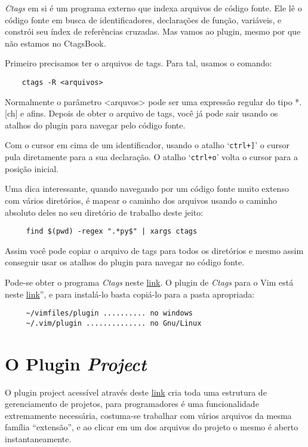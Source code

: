 {\em Ctags} em si é um programa externo que indexa arquivos de código fonte. Ele lê
o código fonte em busca de identificadores, declarações de função, variáveis, e constrói seu 
índex de referências cruzadas. Mas vamos ao plugin, mesmo por que não estamos no CtagsBook.

Primeiro precisamos ter o arquivos de tags. Para tal, usamos o comando:

\begin{verbatim}
    ctags -R <arquivos>
\end{verbatim}

Normalmente o parâmetro <arquvos> pode ser uma expressão regular do tipo *.[ch] e afins. Depois
de obter o arquivo de tags, você já pode sair usando os atalhos do plugin para navegar pelo 
código fonte. 

Com o cursor em cima de um identificador, usando o atalho `\verb|ctrl+]|' o cursor pula diretamente 
para a sua declaração. O atalho `\verb|ctrl+o|' volta o cursor para a posição inicial.

Uma dica interessante, quando navegando por um código fonte muito extenso com vários diretórios, 
é mapear o caminho dos arquivos usando o caminho absoluto deles no seu diretório de trabalho 
deste jeito:

\begin{verbatim}
     find $(pwd) -regex ".*py$" | xargs ctags
\end{verbatim}

Assim você pode copiar o arquivo de tags para todos os diretórios e mesmo assim conseguir usar 
os atalhos do plugin para navegar no código fonte.

Pode-se obter o programa {\em Ctags} neste
\href{http://ctags.sourceforge.net/}{link}. O plugin de {\em Ctags} para o Vim está neste 
\href{http://vim.sourceforge.net/scripts/script.php?script\_id=12}{link}'', 
e para instalá-lo basta copiá-lo para a pasta apropriada:
    
\begin{verbatim}
     ~/vimfiles/plugin .......... no windows
     ~/.vim/plugin .............. no Gnu/Linux
\end{verbatim}


\section{O Plugin {\em Project}}

O plugin project acessível através deste \href{http://www.vim.org/scripts/script.php?script\_id=69}{link}
cria toda uma estrutura de gerenciamento de projetos, para programadores é uma funcionalidade
extremamente necessária, costuma-se trabalhar com vários arquivos da mesma família ``extensão'', 
e ao clicar em um dos arquivos do projeto o mesmo é aberto instantaneamente.

